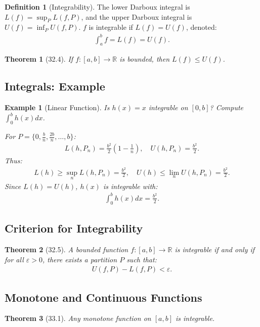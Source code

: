 \documentclass[9pt]{article}
\theoremstyle{definition}
\newtheorem{definition}{Definition}
\theoremstyle{plain}
\newtheorem{theorem}{Theorem}
\newtheorem{example}{Example}
\begin{document}
\begin{definition}[Integrability]
The lower Darboux integral is $ L(f) = \sup_P L(f, P) $, and the upper Darboux integral is $ U(f) = \inf_P U(f, P) $. $ f $ is integrable if $ L(f) = U(f) $, denoted:
\begin{align}
\int_a^b f = L(f) = U(f).
\end{align}
\end{definition}

\begin{theorem}[32.4]
If $ f : [a, b] \to \mathbb{R} $ is bounded, then $ L(f) \leq U(f) $.
\end{theorem}

\subsection*{Integrals: Example}
\begin{example}[Linear Function]
Is $ h(x) = x $ integrable on $ [0, b] $? Compute $ \int_0^b h(x) dx $.

For $ P = \{0, \frac{b}{n}, \frac{2b}{n}, \ldots, b\} $:
\begin{align}
L(h, P_n) = \frac{b^2}{2}\left(1 - \frac{1}{n}\right), \quad U(h, P_n) = \frac{b^2}{2}.
\end{align}
Thus:
\begin{align}
L(h) \geq \sup_n L(h, P_n) = \frac{b^2}{2}, \quad U(h) \leq \lim_n U(h, P_n) = \frac{b^2}{2}.
\end{align}
Since $ L(h) = U(h) $, $ h(x) $ is integrable with:
\begin{align}
\int_0^b h(x) dx = \frac{b^2}{2}.
\end{align}
\end{example}

\subsection*{Criterion for Integrability}
\begin{theorem}[32.5]
A bounded function $ f : [a, b] \to \mathbb{R} $ is integrable if and only if for all $ \varepsilon > 0 $, there exists a partition $ P $ such that:
\begin{align}
U(f, P) - L(f, P) < \varepsilon.
\end{align}
\end{theorem}

\subsection*{Monotone and Continuous Functions}
\begin{theorem}[33.1]
Any monotone function on $ [a, b] $ is integrable.
\end{theorem}
\end{document}

